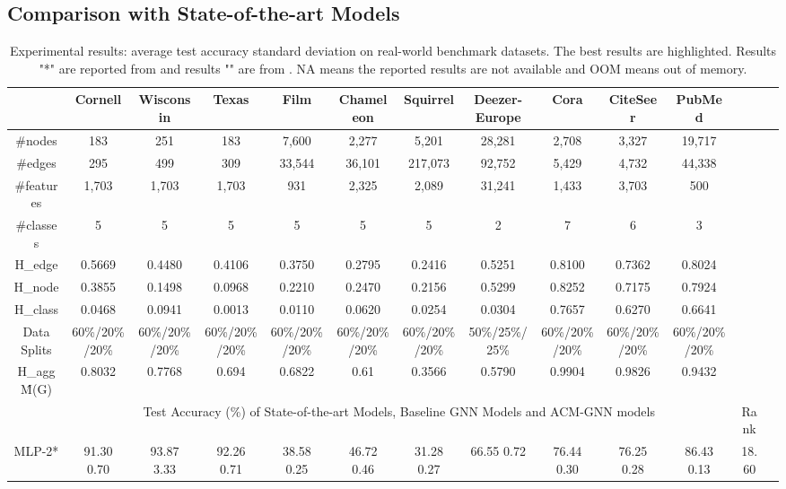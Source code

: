 \documentclass{article}
\newcommand{\0}{{\boldsymbol{0}}}
\newcommand{\6}{{\partial}}
\newcommand{\8}{{\infty}}
\newcommand{\4}{{\nabla}}
\begin{document}
\subsection{Comparison with State-of-the-art Models}
\label{sec:comparison_with_sota}
\begin{table}[htbp]
  \centering
  \tiny
  \setlength{\tabcolsep}{0.5pt}
  \caption{Experimental results: average test accuracy  standard deviation on  real-world benchmark datasets. The best results are highlighted. Results "*" are reported from \cite{chien2021adaptive,lim2021new} and results "" are from \cite{pei2020geom}. NA means the reported results are not available and OOM means out of memory. }
\begin{tabular}{c|cccccccccc|cc}
    \toprule
    \toprule
         & Cornell & Wisconsin & Texas & Film  & Chameleon & Squirrel & Deezer-Europe & Cora  & CiteSeer & PubMed &  \\
    \midrule
    \#nodes & 183   & 251   & 183   & 7,600 & 2,277 & 5,201 & 28,281 & 2,708 & 3,327 & 19,717 &  \\
    \#edges & 295   & 499   & 309   & 33,544 & 36,101 & 217,073 & 92,752 & 5,429 & 4,732 & 44,338 &  \\
    \#features & 1,703 & 1,703 & 1,703 & 931   & 2,325 & 2,089 & 31,241 & 1,433 & 3,703 & 500   &  \\
    \#classes & 5     & 5     & 5     & 5     & 5     & 5     & 2     & 7     & 6     & 3     &  \\
    H\_edge & 0.5669 & 0.4480 & 0.4106 & 0.3750 & 0.2795 & 0.2416 & 0.5251 & 0.8100 & 0.7362 & 0.8024 &  \\
    H\_node & 0.3855 & 0.1498 & 0.0968 & 0.2210 & 0.2470 & 0.2156 & 0.5299 & 0.8252 & 0.7175 & 0.7924 &  \\
    H\_class & 0.0468 & 0.0941 & 0.0013 & 0.0110 & 0.0620 & 0.0254 & 0.0304 & 0.7657 & 0.6270 & 0.6641 &  \\
    Data Splits & 60\%/20\%/20\% & 60\%/20\%/20\% & 60\%/20\%/20\% & 60\%/20\%/20\% & 60\%/20\%/20\% & 60\%/20\%/20\% & 50\%/25\%/25\% & 60\%/20\%/20\% & 60\%/20\%/20\% & 60\%/20\%/20\% &  \\
    H\_agg\^M(G) & 0.8032 & 0.7768 & 0.694 & 0.6822 & 0.61  & 0.3566 & 0.5790 & 0.9904 & 0.9826 & 0.9432 &  \\
    \midrule
    \midrule
          & \multicolumn{10}{c|}{Test Accuracy (\%) of State-of-the-art Models, Baseline GNN Models and ACM-GNN models} & Rank \\
    \midrule
    MLP-2* & 91.30  0.70 & 93.87  3.33 & 92.26  0.71 & 38.58  0.25 & 46.72  0.46 & 31.28  0.27 & 66.55  0.72 & 76.44  0.30 & 76.25  0.28 & 86.43  0.13 & 18.60 \\

\end{tabular}
\end{table}
\end{document}
